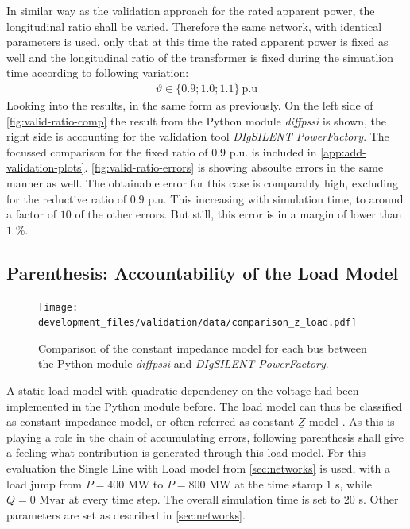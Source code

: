 In similar way as the validation approach for the rated apparent power, the longitudinal ratio shall be varied. 
Therefore the same network, with identical parameters is used, only that at this time the rated apparent power is fixed as well and the longitudinal ratio of the transformer is fixed during the simuatlion time according to following variation:
\begin{align}
    \vartheta \in \{ 0.9; 1.0; 1.1 \}~\mathrm{p.u} \label{eq:variation-ratio}
\end{align}
Looking into the results, in the same form as previously.
On the left side of \autoref{fig:valid-ratio-comp} the result from the Python module \textit{diffpssi} is shown, the right side is accounting for the validation tool \textit{DIgSILENT PowerFactory}.
The focussed comparison for the fixed ratio of $0.9$ p.u. is included in \autoref{app:add-validation-plots}.
\autoref{fig:valid-ratio-errors} is showing absoulte errors in the same manner as well.
The obtainable error for this case is comparably high, excluding for the reductive ratio of $0.9$ p.u.
This increasing with simulation time, to around a factor of $10$ of the other errors. 
But still, this error is in a margin of lower than $1$ \%. 


\subsection{Parenthesis: Accountability of the Load Model}
\label{sec:validation-load-model}

\begin{figure}[htbp!]
    \centering
    \texttt{[image: development\_files/validation/data/comparison\_z\_load.pdf]}
    \caption[Comparison of the constant impedance model for each bus]{Comparison of the constant impedance model for each bus between the Python module \textit{diffpssi} and \textit{DIgSILENT PowerFactory}.}
    \label{fig:z-comp}
\end{figure}

A static load model with quadratic dependency on the voltage had been implemented in the Python module before.
The load model can thus be classified as constant impedance model, or often referred as constant $\underline{Z}$ model \autocite{IEEELoadModeling_2022}. 
As this is playing a role in the chain of accumulating errors, following parenthesis shall give a feeling what contribution is generated through this load model.
For this evaluation the Single Line with Load model from \autoref{sec:networks} is used, with a load jump from $P=400\text{ MW}$ to $P=800\text{ MW}$ at the time stamp $1$ s, while $Q=0\text{ Mvar}$ at every time step.
The overall simulation time is set to $20$ s.
Other parameters are set as described in \autoref{sec:networks}.

